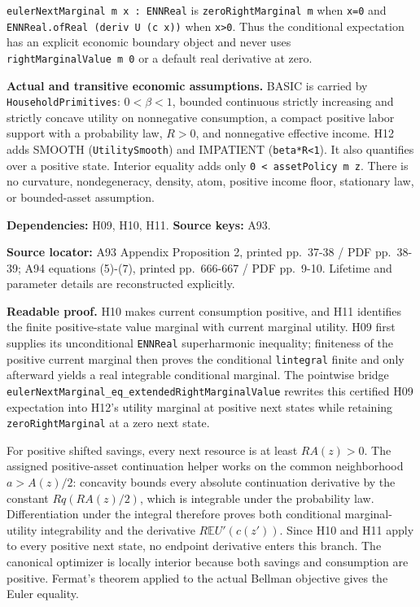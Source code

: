 \documentclass[
  11pt,
]{article}
\let\LedgerOriginalTexttt\texttt
\renewcommand{\texttt}[1]{{\small\LedgerOriginalTexttt{#1}}}
\begin{document}
\texttt{eulerNextMarginal\ m\ x\ :\ ENNReal} is
\texttt{zeroRightMarginal\ m} when \texttt{x=0} and
\texttt{ENNReal.ofReal\ (deriv\ U\ (c\ x))} when
\texttt{x\textgreater{}0}. Thus the conditional expectation has an
explicit economic boundary object and never uses
\texttt{rightMarginalValue\ m\ 0} or a default real derivative at zero.

\textbf{Actual and transitive economic assumptions.} BASIC is carried by
\texttt{HouseholdPrimitives}: \(0<\beta<1\), bounded continuous strictly
increasing and strictly concave utility on nonnegative consumption, a
compact positive labor support with a probability law, \(R>0\), and
nonnegative effective income. H12 adds SMOOTH (\texttt{UtilitySmooth})
and IMPATIENT (\texttt{beta*R\textless{}1}). It also quantifies over a
positive state. Interior equality adds only
\texttt{0\ \textless{}\ assetPolicy\ m\ z}. There is no curvature,
nondegeneracy, density, atom, positive income floor, stationary law, or
bounded-asset assumption.

\textbf{Dependencies:} H09, H10, H11. \textbf{Source keys:} A93.

\textbf{Source locator:} A93 Appendix Proposition 2, printed pp.~37-38 /
PDF pp.~38-39; A94 equations (5)-(7), printed pp.~666-667 / PDF
pp.~9-10. Lifetime and parameter details are reconstructed explicitly.

\textbf{Readable proof.} H10 makes current consumption positive, and H11
identifies the finite positive-state value marginal with current
marginal utility. H09 first supplies its unconditional \texttt{ENNReal}
superharmonic inequality; finiteness of the positive current marginal
then proves the conditional \texttt{lintegral} finite and only afterward
yields a real integrable conditional marginal. The pointwise bridge
\texttt{eulerNextMarginal\_eq\_extendedRightMarginalValue} rewrites this
certified H09 expectation into H12's utility marginal at positive next
states while retaining \texttt{zeroRightMarginal} at a zero next state.

For positive shifted savings, every next resource is at least
\(RA(z)>0\). The assigned positive-asset continuation helper works on
the common neighborhood \(a>A(z)/2\): concavity bounds every absolute
continuation derivative by the constant \(R q(RA(z)/2)\), which is
integrable under the probability law. Differentiation under the integral
therefore proves both conditional marginal-utility integrability and the
derivative \(R\mathbb E U'(c(z'))\). Since H10 and H11 apply to every
positive next state, no endpoint derivative enters this branch. The
canonical optimizer is locally interior because both savings and
consumption are positive. Fermat's theorem applied to the actual Bellman
objective gives the Euler equality.
\end{document}
